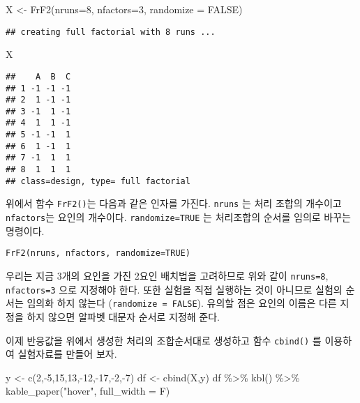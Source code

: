\documentclass[
]{book}
\newenvironment{Shaded}{\begin{snugshade}}{\end{snugshade}}
\newcommand{\AttributeTok}[1]{\textcolor[rgb]{0.77,0.63,0.00}{#1}}
\newcommand{\ConstantTok}[1]{\textcolor[rgb]{0.00,0.00,0.00}{#1}}
\newcommand{\DecValTok}[1]{\textcolor[rgb]{0.00,0.00,0.81}{#1}}
\newcommand{\FunctionTok}[1]{\textcolor[rgb]{0.00,0.00,0.00}{#1}}
\newcommand{\NormalTok}[1]{#1}
\newcommand{\OtherTok}[1]{\textcolor[rgb]{0.56,0.35,0.01}{#1}}
\newcommand{\SpecialCharTok}[1]{\textcolor[rgb]{0.00,0.00,0.00}{#1}}
\newcommand{\StringTok}[1]{\textcolor[rgb]{0.31,0.60,0.02}{#1}}
\begin{document}
\begin{Shaded}
\begin{Highlighting}[]
\NormalTok{X }\OtherTok{\textless{}{-}} \FunctionTok{FrF2}\NormalTok{(}\AttributeTok{nruns=}\DecValTok{8}\NormalTok{, }\AttributeTok{nfactors=}\DecValTok{3}\NormalTok{, }\AttributeTok{randomize =} \ConstantTok{FALSE}\NormalTok{)}
\end{Highlighting}
\end{Shaded}

\begin{verbatim}
## creating full factorial with 8 runs ...
\end{verbatim}

\begin{Shaded}
\begin{Highlighting}[]
\NormalTok{X}
\end{Highlighting}
\end{Shaded}

\begin{verbatim}
##    A  B  C
## 1 -1 -1 -1
## 2  1 -1 -1
## 3 -1  1 -1
## 4  1  1 -1
## 5 -1 -1  1
## 6  1 -1  1
## 7 -1  1  1
## 8  1  1  1
## class=design, type= full factorial
\end{verbatim}

위에서 함수 \texttt{FrF2()}는 다음과 같은 인자를 가진다. \texttt{nruns} 는 처리 조합의 개수이고 \texttt{nfactors}는 요인의 개수이다. \texttt{randomize=TRUE} 는 처리조합의 순서를 임의로 바꾸는 명령이다.

\begin{verbatim}
FrF2(nruns, nfactors, randomize=TRUE)
\end{verbatim}

우리는 지금 3개의 요인을 가진 2요인 배치법을 고려하므로 위와 같이 \texttt{nruns=8}, \texttt{nfactors=3} 으로 지정해야 한다. 또한 실험을 직접 실행하는 것이 아니므로 실험의 순서는 임의화 하지 않는다 (\texttt{randomize\ =\ FALSE}).
유의할 점은 요인의 이름은 다른 지정을 하지 않으면 알파벳 대문자 순서로 지정해 준다.

이제 반응값을 위에서 생성한 처리의 조합순서대로 생성하고 함수 \texttt{cbind()} 를 이용하여 실험자료를 만들어 보자.

\begin{Shaded}
\begin{Highlighting}[]
\NormalTok{y }\OtherTok{\textless{}{-}} \FunctionTok{c}\NormalTok{(}\DecValTok{2}\NormalTok{,}\SpecialCharTok{{-}}\DecValTok{5}\NormalTok{,}\DecValTok{15}\NormalTok{,}\DecValTok{13}\NormalTok{,}\SpecialCharTok{{-}}\DecValTok{12}\NormalTok{,}\SpecialCharTok{{-}}\DecValTok{17}\NormalTok{,}\SpecialCharTok{{-}}\DecValTok{2}\NormalTok{,}\SpecialCharTok{{-}}\DecValTok{7}\NormalTok{)}
\NormalTok{df }\OtherTok{\textless{}{-}} \FunctionTok{cbind}\NormalTok{(X,y)}
\NormalTok{df }\SpecialCharTok{\%\textgreater{}\%}  \FunctionTok{kbl}\NormalTok{() }\SpecialCharTok{\%\textgreater{}\%}   \FunctionTok{kable\_paper}\NormalTok{(}\StringTok{"hover"}\NormalTok{, }\AttributeTok{full\_width =}\NormalTok{ F)}
\end{Highlighting}
\end{Shaded}
\end{document}
